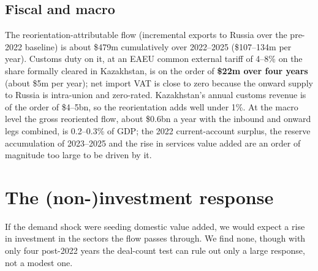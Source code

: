 \documentclass[12pt]{article}
\begin{document}
\subsection{Fiscal and macro}

The reorientation-attributable flow (incremental exports to Russia over the pre-2022
baseline) is about \$479m cumulatively over 2022--2025 (\$107--134m per year). Customs duty on
it, at an EAEU common external tariff of 4--8\% on the share formally cleared in Kazakhstan, is
on the order of \textbf{\$22m over four years} (about \$5m per year); net import VAT is close
to zero because the onward supply to Russia is intra-union and zero-rated. Kazakhstan's annual
customs revenue is of the order of \$4--5bn, so the reorientation adds well under 1\%. At the
macro level the gross reoriented flow, about \$0.6bn a year with the inbound and onward legs
combined, is 0.2--0.3\% of GDP; the 2022 current-account surplus, the reserve accumulation of
2023--2025 and the rise in services value added are an order of magnitude too large to be
driven by it.

\section{The (non-)investment response}\label{sec:investment}

If the demand shock were seeding domestic value added, we would expect a rise in investment
in the sectors the flow passes through. We find none, though with only four post-2022 years
the deal-count test can rule out only a large response, not a modest one.
\end{document}
